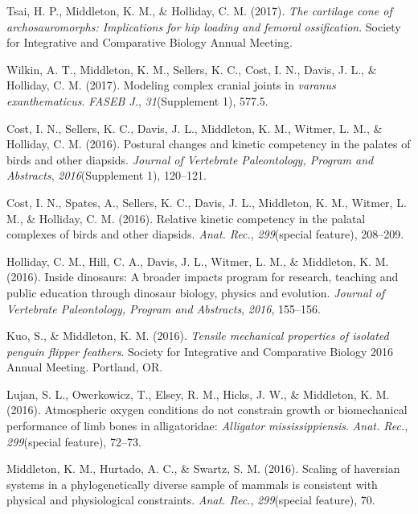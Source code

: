 \documentclass[11pt, a4paper]{awesome-cv}
\begin{document}
\leavevmode\hypertarget{ref-tsai_cartilage_2017}{}%
Tsai, H. P., Middleton, K. M., \& Holliday, C. M. (2017). \emph{The
cartilage cone of archosauromorphs: Implications for hip loading and
femoral ossification}. Society for Integrative and Comparative Biology
Annual Meeting.

\leavevmode\hypertarget{ref-wilkin_modeling_2017}{}%
Wilkin, A. T., Middleton, K. M., Sellers, K. C., Cost, I. N., Davis, J.
L., \& Holliday, C. M. (2017). Modeling complex cranial joints in
\emph{varanus exanthematicus}. \emph{FASEB J.}, \emph{31}(Supplement 1),
577.5.

\leavevmode\hypertarget{ref-cost_postural_2016}{}%
Cost, I. N., Sellers, K. C., Davis, J. L., Middleton, K. M., Witmer, L.
M., \& Holliday, C. M. (2016). Postural changes and kinetic competency
in the palates of birds and other diapsids. \emph{Journal of Vertebrate
Paleontology, Program and Abstracts}, \emph{2016}(Supplement 1),
120--121.

\leavevmode\hypertarget{ref-cost_relative_2016}{}%
Cost, I. N., Spates, A., Sellers, K. C., Davis, J. L., Middleton, K. M.,
Witmer, L. M., \& Holliday, C. M. (2016). Relative kinetic competency in
the palatal complexes of birds and other diapsids. \emph{Anat. Rec.},
\emph{299}(special feature), 208--209.

\leavevmode\hypertarget{ref-holliday_dinosaurs_2016}{}%
Holliday, C. M., Hill, C. A., Davis, J. L., Witmer, L. M., \& Middleton,
K. M. (2016). Inside dinosaurs: A broader impacts program for research,
teaching and public education through dinosaur biology, physics and
evolution. \emph{Journal of Vertebrate Paleontology, Program and
Abstracts}, \emph{2016}, 155--156.

\leavevmode\hypertarget{ref-kuo_tensile_2016}{}%
Kuo, S., \& Middleton, K. M. (2016). \emph{Tensile mechanical properties
of isolated penguin flipper feathers}. Society for Integrative and
Comparative Biology 2016 Annual Meeting. Portland, OR.

\leavevmode\hypertarget{ref-lujan_atmospheric_2016}{}%
Lujan, S. L., Owerkowicz, T., Elsey, R. M., Hicks, J. W., \& Middleton,
K. M. (2016). Atmospheric oxygen conditions do not constrain growth or
biomechanical performance of limb bones in alligatoridae:
\emph{Alligator mississippiensis}. \emph{Anat. Rec.}, \emph{299}(special
feature), 72--73.

\leavevmode\hypertarget{ref-middleton_scaling_2016}{}%
Middleton, K. M., Hurtado, A. C., \& Swartz, S. M. (2016). Scaling of
haversian systems in a phylogenetically diverse sample of mammals is
consistent with physical and physiological constraints. \emph{Anat.
Rec.}, \emph{299}(special feature), 70.
\end{document}
